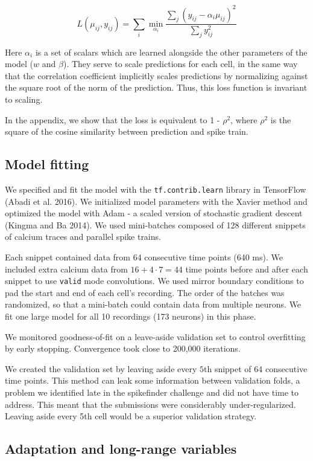 \documentclass[]{article}
\begin{document}
\[
L(\mu_{ij}, y_{ij}) = \sum_i \min_{\alpha_i} \frac{\sum_j (y_{ij} - \alpha_i \mu_{ij})^2}{\sum_{j} y_{ij}^2}
\]

Here \(\alpha_i\) is a set of scalars which are learned alongside the
other parameters of the model (\(w\) and \(\beta\)). They serve to scale
predictions for each cell, in the same way that the correlation
coefficient implicitly scales predictions by normalizing against the
square root of the norm of the prediction. Thus, this loss function is
invariant to scaling.

In the appendix, we show that the loss is equivalent to 1 - \(\rho^2\),
where \(\rho^2\) is the square of the cosine similarity between
prediction and spike train.

\subsection{Model fitting}\label{model-fitting}

We specified and fit the model with the \texttt{tf.contrib.learn}
library in TensorFlow (Abadi et al. 2016). We initialized model
parameters with the Xavier method and optimized the model with Adam - a
scaled version of stochastic gradient descent (Kingma and Ba 2014). We
used mini-batches composed of 128 different snippets of calcium traces
and parallel spike trains.

Each snippet contained data from 64 consecutive time points (640 ms). We
included extra calcium data from \(16 + 4 \cdot 7= 44\) time points
before and after each snippet to use \texttt{valid} mode convolutions.
We used mirror boundary conditions to pad the start and end of each
cell's recording. The order of the batches was randomized, so that a
mini-batch could contain data from multiple neurons. We fit one large
model for all 10 recordings (173 neurons) in this phase.

We monitored goodness-of-fit on a leave-aside validation set to control
overfitting by early stopping. Convergence took close to 200,000
iterations.

We created the validation set by leaving aside every \(5\)th snippet of
64 consecutive time points. This method can leak some information
between validation folds, a problem we identified late in the
spikefinder challenge and did not have time to address. This meant that
the submissions were considerably under-regularized. Leaving aside every
5th cell would be a superior validation strategy.

\subsection{Adaptation and long-range
variables}\label{adaptation-and-long-range-variables}
\end{document}
